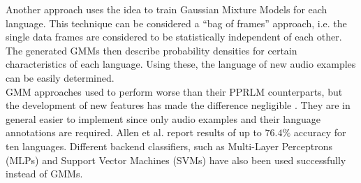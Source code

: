 Another approach uses the idea to train Gaussian Mixture Models for each language. This technique can be considered a ``bag of frames'' approach, i.e. the single data frames are considered to be statistically independent of each other. The generated GMMs then describe probability densities for certain characteristics of each language. Using these, the language of new audio examples can be easily determined.\\
GMM approaches used to perform worse than their PPRLM counterparts, but the development of new features has made the difference negligible \cite{singer}. They are in general easier to implement since only audio examples and their language annotations are required. Allen et al. \cite{allen} report results of up to $76.4\%$ accuracy for ten languages. Different backend classifiers, such as Multi-Layer Perceptrons (MLPs) and Support Vector Machines (SVMs) \cite{campbell} have also been used successfully instead of GMMs.


